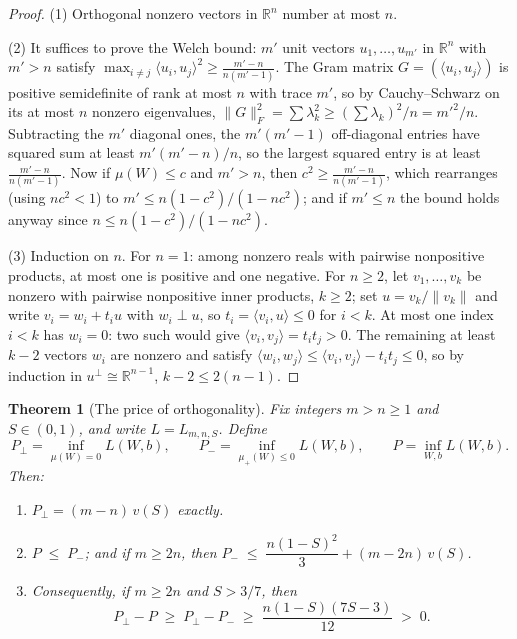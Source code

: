 \documentclass[11pt]{amsart}
\theoremstyle{plain}
\newtheorem{theorem}{Theorem}[section]
\theoremstyle{definition}
\newcommand{\R}{\mathbb{R}}
\begin{document}
\begin{proof}
(1) Orthogonal nonzero vectors in $\R^n$ number at most $n$.

(2) It suffices to prove the Welch bound: $m'$ unit vectors $u_1,\dots,u_{m'}$ in $\R^n$ with $m'>n$ satisfy $\max_{i\ne j}\langle u_i,u_j\rangle^2 \ge \frac{m'-n}{n(m'-1)}$. The Gram matrix $G=(\langle u_i,u_j\rangle)$ is positive semidefinite of rank at most $n$ with trace $m'$, so by Cauchy--Schwarz on its at most $n$ nonzero eigenvalues, $\|G\|_F^2=\sum\lambda_k^2\ge (\sum\lambda_k)^2/n = m'^2/n$. Subtracting the $m'$ diagonal ones, the $m'(m'-1)$ off-diagonal entries have squared sum at least $m'(m'-n)/n$, so the largest squared entry is at least $\frac{m'-n}{n(m'-1)}$. Now if $\mu(W)\le c$ and $m'>n$, then $c^2\ge\frac{m'-n}{n(m'-1)}$, which rearranges (using $nc^2<1$) to $m'\le n(1-c^2)/(1-nc^2)$; and if $m'\le n$ the bound holds anyway since $n\le n(1-c^2)/(1-nc^2)$.

(3) Induction on $n$. For $n=1$: among nonzero reals with pairwise nonpositive products, at most one is positive and one negative. For $n\ge2$, let $v_1,\dots,v_k$ be nonzero with pairwise nonpositive inner products, $k\ge2$; set $u=v_k/\|v_k\|$ and write $v_i=w_i+t_iu$ with $w_i\perp u$, so $t_i=\langle v_i,u\rangle\le0$ for $i<k$. At most one index $i<k$ has $w_i=0$: two such would give $\langle v_i,v_j\rangle=t_it_j>0$. The remaining at least $k-2$ vectors $w_i$ are nonzero and satisfy $\langle w_i,w_j\rangle\le \langle v_i,v_j\rangle - t_it_j\le0$, so by induction in $u^{\perp}\cong\R^{n-1}$, $k-2\le 2(n-1)$.
\end{proof}

\begin{theorem}[The price of orthogonality]\label{thm:price}
Fix integers $m>n\ge 1$ and $S\in(0,1)$, and write $L=L_{m,n,S}$. Define
\[
P_\perp = \inf_{\mu(W)=0} L(W,b), \qquad
P_- = \inf_{\mu_+(W)\le 0} L(W,b), \qquad
P = \inf_{W,b} L(W,b).
\]
Then:
\begin{enumerate}
\item $P_\perp = (m-n)\,v(S)$ exactly.
\item $P \;\le\; P_-$; and if $m\ge 2n$, then $P_- \;\le\; \dfrac{n(1-S)^2}{3}+(m-2n)\,v(S)$.
\item Consequently, if $m\ge 2n$ and $S>3/7$, then
\[
P_\perp - P \;\ge\; P_\perp - P_- \;\ge\; \frac{n(1-S)(7S-3)}{12} \;>\;0 .
\]
\end{enumerate}
\end{theorem}
\end{document}
